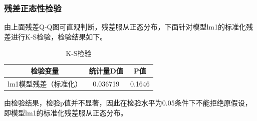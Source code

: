 \documentclass[a4paper,12pt,onecolumn,oneside]{article}
\begin{document}
\subsubsection{残差正态性检验}
由上面残差Q-Q图可直观判断，残差服从正态分布，下面针对模型lm1的标准化残差进行K-S检验，检验结果如下。\par 
\begin{table}[htbp]
	\centering
	\caption{K-S检验}\vspace{0.5\baselineskip}
	\label{tab:ks_test}
	\begin{tabular}{@{}ccc@{}}
		\toprule
		检验变量 & 统计量D值 & P值 \\
		\midrule
		lm1模型残差（标准化） & 0.036719 & 0.1646 \\
		\bottomrule
	\end{tabular}
\end{table}
由检验结果，检验p值并不显著，因此在检验水平为0.05条件下不能拒绝原假设，即模型lm1的标准化残差服从正态分布。
\end{document}
